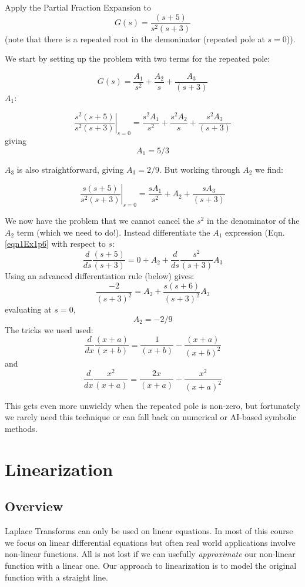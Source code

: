 \begin{ExampleSmall}
Apply the Partial Fraction Expansion to
\[
G(s) = \frac {(s+5)}  {s^2(s+3)}
\]
(note that there is a repeated root  in the demoninator (repeated pole at $s=0$)).

We start by setting up the problem with two terms for the repeated pole:

\[
G(s) = \frac {A_1}{s^2} +  \frac {A_2}{s} +  \frac {A_3}{(s+3)}
\]
$A_1$:

\begin{equation}\label{eqn1Ex1p6}
\left . \frac{s^2(s+5)} {s^2(s+3)}\right |_{s=0}  = \frac {s^2A_1}  {s^2}   + \frac{s^2A_2} {s} + \frac {s^2A_3} {(s+3)}
\end{equation}
giving
\[
A_1 = 5/3
\]

$A_3$ is also straightforward, giving $A_3 = 2/9$. But working through $A_2$ we find:

\[
\left . \frac{s(s+5)} {s^2(s+3)}\right |_{s=0}  = \frac {sA_1}  {s^2}   + {A_2}  + \frac {sA_3} {(s+3)}
\]

We now have the problem that we cannot cancel the $s^2$ in the denominator of the $A_2$ term (which we need to do!).   Instead differentiate the $A_1$ expression (Eqn. \ref{eqn1Ex1p6} with respect to $s$:
\[
\frac{d}{ds}\frac{(s+5)}{(s+3)} = 0 + A_2 + \frac{d}{ds} \frac{s^2}{(s+3)}A_3
\]
Using an advanced differentiation rule (below) gives:
\[
\frac{-2}{(s+3)^2} = A_2 + \frac{s(s+6)}{(s+3)^2}A_3
\]
evaluating at $s=0$,
\[
A_2 = -2/9
\]
The tricks we used used:
\[
\frac{d}{dx}\frac{(x+a)}{(x+b)} = \frac{1}{(x+b)} - \frac{(x+a)}{(x+b)^2}
\]
and
\[
\frac{d}{dx} \frac{x^2}{(x+a)} = \frac{2x}{(x+a)} - \frac{x^2}{(x+a)^2}
\]

This gets even more unwieldy when the repeated pole is non-zero, but fortunately we rarely need this technique or can fall back on numerical
or AI-based symbolic methods.
\end{ExampleSmall}




\section{Linearization}

\subsection{Overview}
Laplace Transforms can only be used on linear equations.  In most of this course we focus on linear differential equations but often real world applications involve non-linear functions.   All is not lost if we can usefully {\it approximate} our non-linear function with a linear one.  Our approach to linearization is to model the original function with a straight line.


